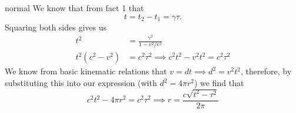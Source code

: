 \begin{solution}{normal}
We know that from fact 1 that
\[t = t_2 - t_1 = \gamma\tau.\]Squaring both sides gives us
\begin{align*}
t^2 &= \frac{\gamma^2}{1-v^2/c^2}\\
t^2 (c^2 - v^2) &= c^2\tau^2 \implies c^2t^2 - v^2t^2 = c^2\tau^2
\end{align*}
We know from basic kinematic relations that $v= dt\implies d^2 = v^2t^2$, therefore, by substituting this into our expression (with $d^2 = 4\pi r^2$) we find that
\[c^2t^2-4\pi r^2 = c^2\tau^2\implies \boxed{r=\frac{c\sqrt{t^2 - \tau^2}}{2\pi}}\]
\end{solution}